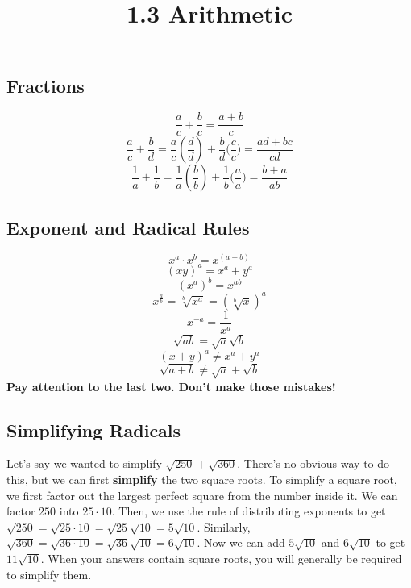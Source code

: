 \documentclass{article}
\title{1.3 Arithmetic}
\author{}
\date{}
\begin{document}
\maketitle
\subsection*{Fractions}
    \[\frac{a}{c} + \frac{b}{c} = \frac{a + b}{c}\]
    \[\frac{a}{c} + \frac{b}{d} = \frac{a}{c} \left(\frac{d}{d}\right) + \frac{b}{d}\biggl(\frac{c}{c}\biggl) = \frac{ad + bc}{cd}\]
    \[\frac{1}{a} + \frac{1}{b} = \frac{1}{a} \left(\frac{b}{b}\right) + \frac{1}{b}\biggl(\frac{a}{a}\biggl) = \frac{b + a}{ab}\] 

\subsection*{Exponent and Radical Rules}
    \[x^a \cdot x^b = x^{(a + b)}\]
    \[(xy)^a = x^a + y^a\]
    \[(x^a)^b = x^{ab}\]
    \[x^{\frac{a}{b}} = \sqrt[b]{x^a} = \left(\sqrt[b]{x}\right)^a\]
    \[x^{-a} = \frac{1}{x^a}\]
    \[\sqrt{ab} = \sqrt{a}\sqrt{b}\]
    \[(x + y)^a \neq x^a + y^a\]
    \[\sqrt{a + b} \neq \sqrt{a} + \sqrt{b}\]
    \textbf{Pay attention to the last two. Don't make those mistakes!}

\subsection*{Simplifying Radicals}
    Let's say we wanted to simplify $\sqrt{250} + \sqrt{360}$. There's no
    obvious way to do this, but we can first \textbf{simplify} the two square
    roots. To simplify a square root, we first factor out the largest perfect
    square from the number inside it. We can factor $250$ into $25 \cdot 10$.
    Then, we use the rule of distributing exponents to get $\sqrt{250} =
    \sqrt{25 \cdot 10} = \sqrt{25}\sqrt{10} = 5\sqrt{10}$. Similarly,
    $\sqrt{360} = \sqrt{36 \cdot 10} = \sqrt{36}\sqrt{10} = 6\sqrt{10}$. Now we
    can add $5\sqrt{10}$ and $6\sqrt{10}$ to get $11\sqrt{10}$. When your
    answers contain square roots, you will generally be required to simplify
    them.
\end{document}
